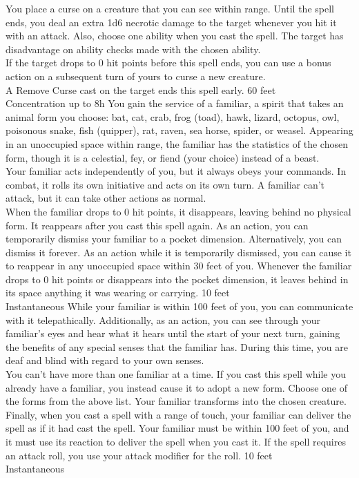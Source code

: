 \documentclass{article}
\begin{document}
    {You place a curse on a creature that you can see within range. Until the spell ends, you deal an extra 1d6 necrotic damage to the target whenever you hit it with an attack. Also, choose one ability when you cast the spell. The target has disadvantage on ability checks made with the chosen ability. 
    \\[1mm]
    If the target drops to 0 hit points before this spell ends, you can use a bonus action on a subsequent turn of yours to curse a new creature.
    \\[1mm]
    A Remove Curse cast on the target ends this spell early.}
    {60 feet\\Concentration up to 8h}%
    {You gain the service of a familiar, a spirit that takes an animal form you choose: bat, cat, crab, frog (toad), hawk, lizard, octopus, owl, poisonous snake, fish (quipper), rat, raven, sea horse, spider, or weasel. Appearing in an unoccupied space within range, the familiar has the statistics of the chosen form, though it is a celestial, fey, or fiend (your choice) instead of a beast.
    \\[1mm]
    Your familiar acts independently of you, but it always obeys your commands. In combat, it rolls its own initiative and acts on its own turn. A familiar can’t attack, but it can take other actions as normal.
    \\[1mm]
    When the familiar drops to 0 hit points, it disappears, leaving behind no physical form. It reappears after you cast this spell again. As an action, you can temporarily dismiss your familiar to a pocket dimension. Alternatively, you can dismiss it forever. As an action while it is temporarily dismissed, you can cause it to reappear in any unoccupied space within 30 feet of you. Whenever the familiar drops to 0 hit points or disappears into the pocket dimension, it leaves behind in its space anything it was wearing or carrying.}
    {10 feet\\Instantaneous}%
    {While your familiar is within 100 feet of you, you can communicate with it telepathically. Additionally, as an action, you can see through your familiar’s eyes and hear what it hears until the start of your next turn, gaining the benefits of any special senses that the familiar has. During this time, you are deaf and blind with regard to your own senses.
    \\[1mm]
    You can’t have more than one familiar at a time. If you cast this spell while you already have a familiar, you instead cause it to adopt a new form. Choose one of the forms from the above list. Your familiar transforms into the chosen creature.
    \\[1mm]
    Finally, when you cast a spell with a range of touch, your familiar can deliver the spell as if it had cast the spell. Your familiar must be within 100 feet of you, and it must use its reaction to deliver the spell when you cast it. If the spell requires an attack roll, you use your attack modifier for the roll.}
    {10 feet\\Instantaneous}%
\end{document}

